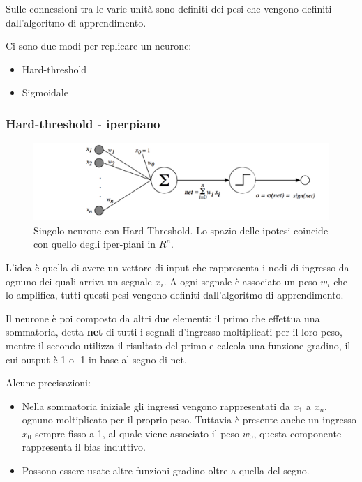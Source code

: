 Sulle connessioni tra le varie unità sono definiti dei pesi che vengono
definiti dall'algoritmo di apprendimento.

Ci sono due modi per replicare un neurone:

\begin{itemize}
\item Hard-threshold
\item Sigmoidale
\end{itemize}

\subsubsection{Hard-threshold - iperpiano}\label{hard-threshold---iperpiano}

\begin{figure}[htbp]
\centering
\includegraphics[width=\textwidth]{./notes/immagini/l9-threshold.png}
\caption{Singolo neurone con Hard Threshold. Lo spazio delle ipotesi coincide con quello degli iper-piani in $R^n$.}
\end{figure}

L'idea è quella di avere un vettore di input che rappresenta i nodi di
ingresso da ognuno dei quali arriva un segnale $x_i$. A ogni segnale è
associato un peso $w_i$ che lo amplifica, tutti questi pesi vengono
definiti dall'algoritmo di apprendimento.

Il neurone è poi composto da altri due elementi: il primo che effettua
una sommatoria, detta \textbf{net} di tutti i segnali d'ingresso
moltiplicati per il loro peso, mentre il secondo utilizza il risultato
del primo e calcola una funzione gradino, il cui output è 1 o -1 in base
al segno di net.

Alcune precisazioni:

\begin{itemize}
\item
  Nella sommatoria iniziale gli ingressi vengono rappresentati da $x_1$ a
  $x_n$, ognuno moltiplicato per il proprio peso. Tuttavia è presente anche
  un ingresso $x_0$ sempre fisso a 1, al quale viene associato il peso $w_0$,
  questa componente rappresenta il bias induttivo.
\item
  Possono essere usate altre funzioni gradino oltre a quella del segno.
\end{itemize}

